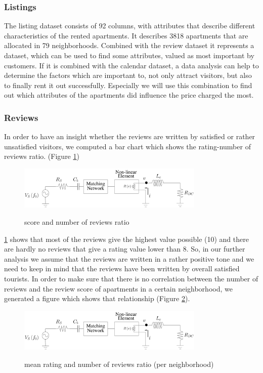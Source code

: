 \subsubsection{Listings}
The listing dataset consists of 92 columns, with attributes that describe different characteristics of the rented apartments. It describes 3818 apartments that are allocated in 79 neighborhoods. Combined with the review dataset it represents a dataset, which can be used to find some attributes, valued as most important by customers. If it is combined with the calendar dataset, a data analysis can help to determine the factors which are important to, not only attract visitors, but also to finally rent it out successfully. Especially we will use this combination to find out which attributes of the apartments did influence the price charged the most.
\subsubsection{Reviews}
In order to have an insight whether the reviews are written by satisfied or rather unsatisfied visitors, we computed a bar chart which shows the rating-number of reviews ratio. (Figure \ref{score_reviews_ratio})
\begin{figure}
  \begin{center}
  \includegraphics[width=3.5in]{pdf/01.pdf}\\
  \caption{score and number of reviews ratio}\label{score_reviews_ratio}
  \end{center}
\end{figure}
\ref{score_reviews_ratio} shows that most of the reviews give the highest value possible (10) and there are hardly no reviews that give a rating value lower than 8. So, in our further analysis we assume that the reviews are written in a rather positive tone and we need to keep in mind that the reviews have been written by overall satisfied tourists.
In order to make sure that there is no correlation between the number of reviews and the review score of apartments in a certain neighborhood, we generated a figure which shows that relationship (Figure \ref{score_reviews_ratio_neighborhood}).
\begin{figure}
  \begin{center}
  \includegraphics[width=3.5in]{pdf/01.pdf}\\
  \caption{mean rating and number of reviews ratio (per neighborhood)}\label{score_reviews_ratio_neighborhood}
  \end{center}
\end{figure}
